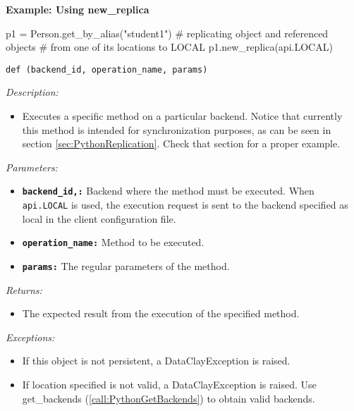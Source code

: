 \begin{tBox}
\textcolor{basecolor} {\bf Example: Using new\_replica}
\begin{python}
p1 = Person.get_by_alias("student1")
# replicating object and referenced objects
# from one of its locations to LOCAL
p1.new_replica(api.LOCAL)
\end{python}
\end{tBox}



\begin{dBox}
\texttt{def (backend\_id, operation\_name, params)}
\LINE

{\it Description:}

\begin{itemize}
    \item Executes a specific method on a particular backend. Notice that currently this method is intended for synchronization purposes, as can be seen in
  section \ref{sec:PythonReplication}. Check that section for a proper example.
\end{itemize}

{\it Parameters:}

\begin{itemize}
    \item \texttt{\bfseries backend\_id,:} Backend where the method must be executed. When \texttt{api.LOCAL} is used, the execution request is sent to the backend specified as local in the client configuration file.
    \item \texttt{\bfseries operation\_name:} Method to be executed.
    \item \texttt{\bfseries params:} The regular parameters of the method.
\end{itemize}
 
{\it Returns:}

\begin{itemize}
    \item The expected result from the execution of the specified method.
\end{itemize}

{\it Exceptions:}

\begin{itemize}
    \item If this object is not persistent, a DataClayException is raised.
    \item If location specified is not valid, a DataClayException is raised. Use get\_backends (\ref{call:PythonGetBackends}) to obtain valid backends.
\end{itemize}

\end{dBox}

